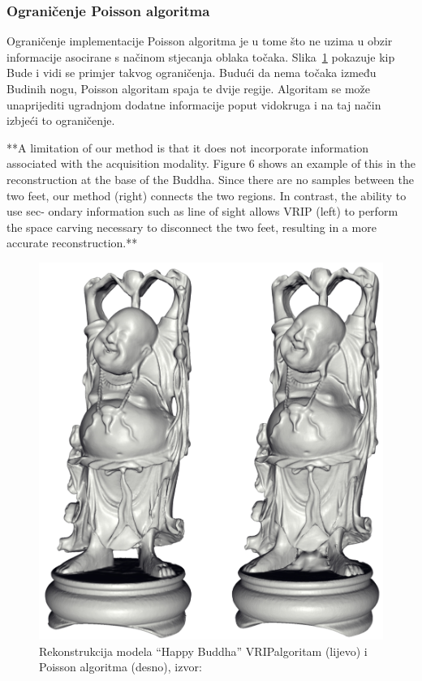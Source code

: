 
\subsubsection{Ograničenje Poisson algoritma} %
\label{ssub:Ograničenje Poisson algoritma}

Ograničenje implementacije Poisson algoritma je u tome što ne uzima u
obzir informacije asocirane s načinom stjecanja oblaka točaka.
Slika~\ref{fig:poisson-buddha.png} pokazuje kip Bude i vidi se primjer takvog
ograničenja. Budući da nema točaka između Budinih nogu, Poisson
algoritam spaja te dvije regije. Algoritam se može unaprijediti
ugradnjom dodatne informacije poput vidokruga i na taj način izbjeći to
ograničenje.

**A limitation of our method
is that it does not incorporate information associated with
the acquisition modality. Figure 6 shows an example of this
in the reconstruction at the base of the Buddha. Since there
are no samples between the two feet, our method (right)
connects the two regions. In contrast, the ability to use sec-
ondary information such as line of sight allows VRIP (left)
to perform the space carving necessary to disconnect the two
feet, resulting in a more accurate reconstruction.**


\begin{figure}[h]
\centering
\includegraphics[scale=0.20]{figures/poisson-buddha.png}
\caption[]{Rekonstrukcija modela ``Happy Buddha'' 
VRIP\footnotemark[2] algoritam (lijevo) i Poisson algoritma (desno),
izvor:~\cite{Kazhdan:2006}}
\label{fig:poisson-buddha.png}
\end{figure}

